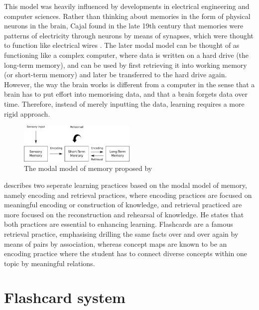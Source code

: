 This model was heavily influenced by developments in electrical engineering and computer sciences. Rather than thinking about memories in the form of physical neurons in the brain, Cajal found in the late 19th century that memories were patterns of electricity through neurons by means of synapses, which were thought to function like electrical wires \cite{longtermpotentiation}. The later modal model can be thought of as functioning like a complex computer, where data is written on a hard drive (the long-term memory), and can be used by first retrieving it into working memory (or short-term memory) and later be transferred to the hard drive again. However, the way the brain works is different from a computer in the sense that a brain has to put effort into memorising data, and that a brain forgets data over time. Therefore, instead of merely inputting the data, learning requires a more rigid approach.

\begin{figure}
    \centering
    \includegraphics[width=0.5\textwidth]{img/modalmemory.png}
    \caption{The modal model of memory proposed by \protect{}}
    \label{fig:modalmemory}
\end{figure}

 describes two seperate learning practices based on the modal model of memory, namely encoding and retrieval practices, where encoding practices are focused on meaningful encoding or construction of knowledge, and retrieval practiced are more focused on the reconstruction and rehearsal of knowledge. He states that both practices are essential to enhancing learning. Flashcards are a famous retrieval practice, emphasising drilling the same facts over and over again by means of pairs by association, whereas concept maps are known to be an encoding practice where the student has to connect diverse concepts within one topic by meaningful relations.

\section{Flashcard system}

